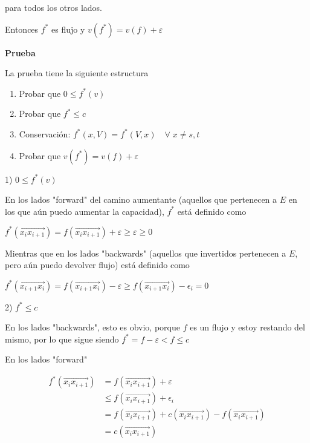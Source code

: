\documentclass[10pt,a4paper]{article}
\begin{document}
para todos los otros lados.

Entonces $f^*$ es flujo y $v(f^*) = v(f)+\varepsilon$

\textbf{Prueba}

La prueba tiene la siguiente estructura

\begin{enumerate}

	\item Probar que $0 \leq f^* (v)$
	\item Probar que $f^* \leq c$
	\item Conservación: $f^*(x, V) = f^*(V, x) \quad\forall\; x\neq s, t$
	\item Probar que $v(f^*) = v(f)+\varepsilon$
\end{enumerate}

1) $0 \leq f^* (v)$

En los lados "forward" del camino aumentante (aquellos que pertenecen a $E$ en los que aún puedo aumentar la capacidad), $f^*$ está definido como

\begin{center}
$f^*(\overrightarrow{x_ix_{i+1}}) = f(\overrightarrow{x_ix_{i+1}})+\varepsilon \geq \varepsilon \geq 0 $
\end{center}

Mientras que en los lados "backwards" (aquellos que invertidos pertenecen a $E$, pero aún puedo devolver flujo) está definido como

\begin{center}
$f^*(\overrightarrow{x_{i+1}x_{i}}) = f(\overrightarrow{x_{i+1}x_{i}}) - \varepsilon \geq f(\overrightarrow{x_{i+1}x_{i}}) -\epsilon_i = 0$
\end{center}

2) $f^* \leq c$

En los lados "backwards", esto es obvio, porque $f$ es un flujo y estoy restando del mismo, por lo que sigue siendo $f^* = f - \varepsilon < f \leq c $

En los lados "forward"

\begin{center}
\begin{align*} f^*(\overrightarrow{x_ix_{i+1}}) &= f(\overrightarrow{x_ix_{i+1}}) + \varepsilon\\ &\leq f(\overrightarrow{x_ix_{i+1}}) + \epsilon_i\\ &= f(\overrightarrow{x_ix_{i+1}})+c(\overrightarrow{x_ix_{i+1}})-f(\overrightarrow{x_ix_{i+1}})\\ &= c(\overrightarrow{x_ix_{i+1}}) \end{align*}
\end{center}
\end{document}
